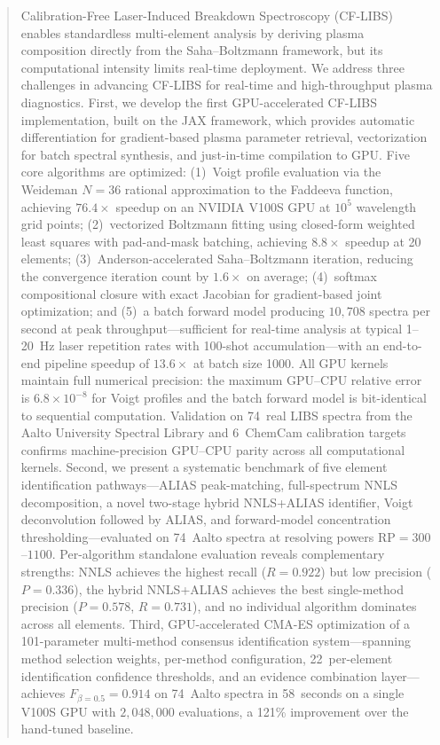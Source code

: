 \begin{abstract}
Calibration-Free Laser-Induced Breakdown Spectroscopy (CF-LIBS) enables standardless multi-element analysis by deriving plasma composition directly from the Saha--Boltzmann framework, but its computational intensity limits real-time deployment.
We address three challenges in advancing CF-LIBS for real-time and high-throughput plasma diagnostics.
First, we develop the first GPU-accelerated CF-LIBS implementation, built on the JAX framework, which provides automatic differentiation for gradient-based plasma parameter retrieval, vectorization for batch spectral synthesis, and just-in-time compilation to GPU.
Five core algorithms are optimized: (1)~Voigt profile evaluation via the Weideman $N\!=\!36$ rational approximation to the Faddeeva function, achieving $76.4\times$ speedup on an NVIDIA V100S GPU at $10^5$ wavelength grid points; (2)~vectorized Boltzmann fitting using closed-form weighted least squares with pad-and-mask batching, achieving $8.8\times$ speedup at 20 elements; (3)~Anderson-accelerated Saha--Boltzmann iteration, reducing the convergence iteration count by $1.6\times$ on average; (4)~softmax compositional closure with exact Jacobian for gradient-based joint optimization; and (5)~a batch forward model producing $10{,}708$ spectra per second at peak throughput---sufficient for real-time analysis at typical 1--20~Hz laser repetition rates with 100-shot accumulation---with an end-to-end pipeline speedup of $13.6\times$ at batch size 1000.
All GPU kernels maintain full numerical precision: the maximum GPU--CPU relative error is $6.8 \times 10^{-8}$ for Voigt profiles and the batch forward model is bit-identical to sequential computation.
Validation on 74~real LIBS spectra from the Aalto University Spectral Library and 6~ChemCam calibration targets confirms machine-precision GPU--CPU parity across all computational kernels.
Second, we present a systematic benchmark of five element identification pathways---ALIAS peak-matching, full-spectrum NNLS decomposition, a novel two-stage hybrid NNLS+ALIAS identifier, Voigt deconvolution followed by ALIAS, and forward-model concentration thresholding---evaluated on 74~Aalto spectra at resolving powers $\mathrm{RP} = 300$--$1100$.
Per-algorithm standalone evaluation reveals complementary strengths: NNLS achieves the highest recall ($R = 0.922$) but low precision ($P = 0.336$), the hybrid NNLS+ALIAS achieves the best single-method precision ($P = 0.578$, $R = 0.731$), and no individual algorithm dominates across all elements.
Third, GPU-accelerated CMA-ES optimization of a 101-parameter multi-method consensus identification system---spanning method selection weights, per-method configuration, 22~per-element identification confidence thresholds, and an evidence combination layer---achieves $F_{\beta=0.5} = 0.914$ on 74~Aalto spectra in 58~seconds on a single V100S GPU with $2{,}048{,}000$ evaluations, a 121\% improvement over the hand-tuned baseline.

\end{abstract}
